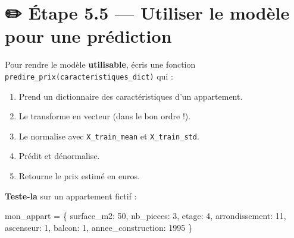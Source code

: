 \documentclass[
  french,
  11pt,
  a4paper,
]{scrbook}
\newenvironment{Shaded}{}{}
\newcommand{\DecValTok}[1]{\textcolor[rgb]{0.00,0.36,0.77}{#1}}
\newcommand{\NormalTok}[1]{\textcolor[rgb]{0.14,0.16,0.18}{#1}}
\newcommand{\OperatorTok}[1]{\textcolor[rgb]{0.14,0.16,0.18}{#1}}
\newcommand{\StringTok}[1]{\textcolor[rgb]{0.01,0.18,0.38}{#1}}
\providecommand{\tightlist}{%
  \setlength{\itemsep}{0pt}\setlength{\parskip}{0pt}}
\begin{document}
\section{✏️ Étape 5.5 --- Utiliser le modèle pour une
prédiction}\label{uxe9tape-5.5-utiliser-le-moduxe8le-pour-une-pruxe9diction}

\begin{tcolorbox}[enhanced jigsaw, arc=.35mm, bottomrule=.15mm, bottomtitle=1mm, breakable, colback=white, colbacktitle=quarto-callout-note-color!10!white, colframe=quarto-callout-note-color-frame, coltitle=black, left=2mm, leftrule=.75mm, opacityback=0, opacitybacktitle=0.6, rightrule=.15mm, title={📝 À faire}, titlerule=0mm, toprule=.15mm, toptitle=1mm]

Pour rendre le modèle \textbf{utilisable}, écris une fonction
\texttt{predire\_prix(caracteristiques\_dict)} qui :

\begin{enumerate}
\def\labelenumi{\arabic{enumi}.}
\tightlist
\item
  Prend un dictionnaire des caractéristiques d'un appartement.
\item
  Le transforme en vecteur (dans le bon ordre !).
\item
  Le normalise avec \texttt{X\_train\_mean} et \texttt{X\_train\_std}.
\item
  Prédit et dénormalise.
\item
  Retourne le prix estimé en euros.
\end{enumerate}

\textbf{Teste-la} sur un appartement fictif :

\begin{Shaded}
\begin{Highlighting}[]
\NormalTok{mon\_appart }\OperatorTok{=}\NormalTok{ \{}
    \StringTok{\textquotesingle{}surface\_m2\textquotesingle{}}\NormalTok{: }\DecValTok{50}\NormalTok{,}
    \StringTok{\textquotesingle{}nb\_pieces\textquotesingle{}}\NormalTok{: }\DecValTok{3}\NormalTok{,}
    \StringTok{\textquotesingle{}etage\textquotesingle{}}\NormalTok{: }\DecValTok{4}\NormalTok{,}
    \StringTok{\textquotesingle{}arrondissement\textquotesingle{}}\NormalTok{: }\DecValTok{11}\NormalTok{,}
    \StringTok{\textquotesingle{}ascenseur\textquotesingle{}}\NormalTok{: }\DecValTok{1}\NormalTok{,}
    \StringTok{\textquotesingle{}balcon\textquotesingle{}}\NormalTok{: }\DecValTok{1}\NormalTok{,}
    \StringTok{\textquotesingle{}annee\_construction\textquotesingle{}}\NormalTok{: }\DecValTok{1995}
\NormalTok{\}}
\end{Highlighting}
\end{Shaded}

\end{tcolorbox}
\end{document}
